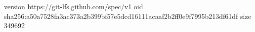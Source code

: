 version https://git-lfs.github.com/spec/v1
oid sha256:a50a7528fa3ac373a2b399bf57e5dcd16111acaaf2b2ff0e9f7995b213df61df
size 349692
